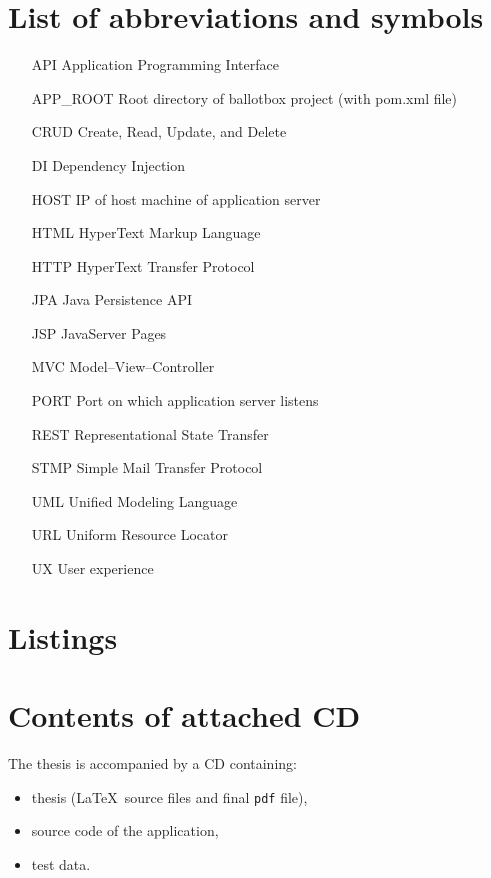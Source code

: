 \documentclass[a4paper,twoside,12pt]{book}
\begin{document}
\begin{appendices} 

\chapter*{List of abbreviations and symbols}

\begin{itemize}
  \item[API] Application Programming Interface
  \item[APP\_ROOT] Root directory of ballotbox project (with pom.xml file)
  \item[CRUD] Create, Read, Update, and Delete 
  \item[DI] Dependency Injection 
  \item[HOST] IP of host machine of application server  
  \item[HTML] HyperText Markup Language
  \item[HTTP] HyperText Transfer Protocol
  \item[JPA] Java Persistence API
  \item[JSP] JavaServer Pages
  \item[MVC] Model--View--Controller
  \item[PORT] Port on which application server listens
  \item[REST] Representational State Transfer
  \item[STMP] Simple Mail Transfer Protocol 
  \item[UML] Unified Modeling Language
  \item[URL] Uniform Resource Locator
  \item[UX] User experience 
\end{itemize}


\chapter*{Listings}

\chapter*{Contents of attached CD}

The thesis is accompanied by a CD containing:
\begin{itemize}
\item thesis (\LaTeX\ source files and final \texttt{pdf} file),
\item source code of the application,
\item test data.
\end{itemize}
 

\listoffigures
\listoftables
	
\end{appendices}
\end{document}
